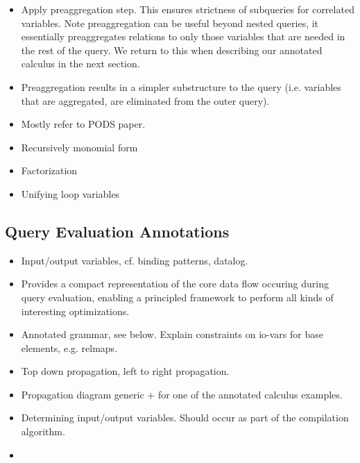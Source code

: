 \begin{itemize}
  \item Apply preaggregation step. This ensures strictness of subqueries for
  correlated variables. Note preaggregation can be useful beyond nested
  queries, it essentially preaggregates relations to only those variables that
  are needed in the rest of the query. We return to this when describing our
  annotated calculus in the next section.
  \item Preaggregation results in a simpler substructure to the query (i.e.
  variables that are aggregated, are eliminated from the outer query).
\end{itemize}


\begin{itemize}
  \item Mostly refer to PODS paper.
\end{itemize}

\begin{itemize}
  \item Recursively monomial form
  \item Factorization
  \item Unifying loop variables
\end{itemize}



\subsection{Query Evaluation Annotations}

\begin{itemize}
  \item Input/output variables, cf. binding patterns, datalog.
  \item Provides a compact representation of the core data flow occuring during
        query evaluation, enabling a principled framework to perform all kinds
        of interesting optimizations.
  \item Annotated grammar, see below. Explain constraints on io-vars for
        base elements, e.g. relmaps. 
  \item Top down propagation, left to right propagation.
  \item Propagation diagram generic + for one of the annotated calculus
        examples.
  \item Determining input/output variables. Should occur as part of the
       compilation algorithm. 
  \item {} 
\end{itemize}

